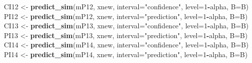 \documentclass[12pt,]{book}
\newenvironment{Shaded}{\begin{snugshade}}{\end{snugshade}}
\newcommand{\DataTypeTok}[1]{\textcolor[rgb]{0.13,0.29,0.53}{#1}}
\newcommand{\DecValTok}[1]{\textcolor[rgb]{0.00,0.00,0.81}{#1}}
\newcommand{\KeywordTok}[1]{\textcolor[rgb]{0.13,0.29,0.53}{\textbf{#1}}}
\newcommand{\NormalTok}[1]{#1}
\newcommand{\OperatorTok}[1]{\textcolor[rgb]{0.81,0.36,0.00}{\textbf{#1}}}
\newcommand{\StringTok}[1]{\textcolor[rgb]{0.31,0.60,0.02}{#1}}
\begin{document}
\begin{Shaded}
\begin{Highlighting}[]
\NormalTok{CI12 <-}\StringTok{ }\KeywordTok{predict_sim}\NormalTok{(mP12, xnew, }\DataTypeTok{interval=}\StringTok{"confidence"}\NormalTok{, }\DataTypeTok{level=}\DecValTok{1}\OperatorTok{-}\NormalTok{alpha, }\DataTypeTok{B=}\NormalTok{B)}
\NormalTok{PI12 <-}\StringTok{ }\KeywordTok{predict_sim}\NormalTok{(mP12, xnew, }\DataTypeTok{interval=}\StringTok{"prediction"}\NormalTok{, }\DataTypeTok{level=}\DecValTok{1}\OperatorTok{-}\NormalTok{alpha, }\DataTypeTok{B=}\NormalTok{B)}
\NormalTok{CI13 <-}\StringTok{ }\KeywordTok{predict_sim}\NormalTok{(mP13, xnew, }\DataTypeTok{interval=}\StringTok{"confidence"}\NormalTok{, }\DataTypeTok{level=}\DecValTok{1}\OperatorTok{-}\NormalTok{alpha, }\DataTypeTok{B=}\NormalTok{B)}
\NormalTok{PI13 <-}\StringTok{ }\KeywordTok{predict_sim}\NormalTok{(mP13, xnew, }\DataTypeTok{interval=}\StringTok{"prediction"}\NormalTok{, }\DataTypeTok{level=}\DecValTok{1}\OperatorTok{-}\NormalTok{alpha, }\DataTypeTok{B=}\NormalTok{B)}
\NormalTok{CI14 <-}\StringTok{ }\KeywordTok{predict_sim}\NormalTok{(mP14, xnew, }\DataTypeTok{interval=}\StringTok{"confidence"}\NormalTok{, }\DataTypeTok{level=}\DecValTok{1}\OperatorTok{-}\NormalTok{alpha, }\DataTypeTok{B=}\NormalTok{B)}
\NormalTok{PI14 <-}\StringTok{ }\KeywordTok{predict_sim}\NormalTok{(mP14, xnew, }\DataTypeTok{interval=}\StringTok{"prediction"}\NormalTok{, }\DataTypeTok{level=}\DecValTok{1}\OperatorTok{-}\NormalTok{alpha, }\DataTypeTok{B=}\NormalTok{B)}


\end{Highlighting}
\end{Shaded}
\end{document}
